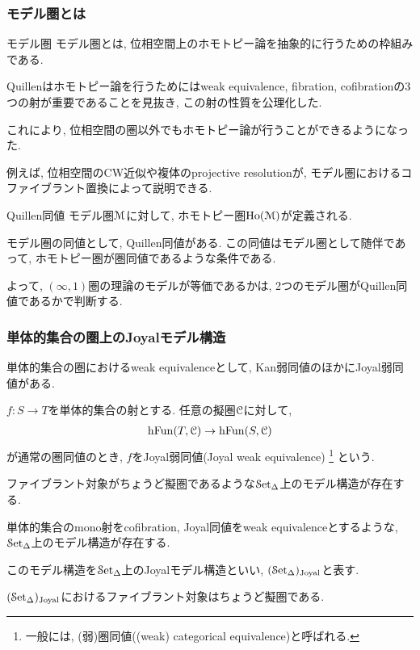 \documentclass[aspectratio=169, dvipdfmx, 8pt, notheorems, uplatex]{beamer}
\begin{document}
\begin{frame}
  \frametitle{モデル圏とは}

  \begin{block}{モデル圏}
    モデル圏とは, 位相空間上のホモトピー論を抽象的に行うための枠組みである. 

    Quillenはホモトピー論を行うためにはweak equivalence, fibration, cofibrationの3つの射が重要であることを見抜き, この射の性質を公理化した. 

    これにより, 位相空間の圏以外でもホモトピー論が行うことができるようになった. 

    例えば, 位相空間のCW近似や複体のprojective resolutionが, モデル圏におけるコファイブラント置換によって説明できる. 
  \end{block}

  \begin{block}{Quillen同値}
    モデル圏$\mathcal{M}$に対して, ホモトピー圏$\mathrm{Ho}(\mathcal{M})$が定義される. 
    
    モデル圏の同値として, Quillen同値がある. 
    この同値はモデル圏として随伴であって, ホモトピー圏が圏同値であるような条件である. 

    よって, $(\infty,1)$圏の理論のモデルが等価であるかは, 2つのモデル圏がQuillen同値であるかで判断する. 
  \end{block}

\end{frame}

\begin{frame}
  \frametitle{単体的集合の圏上のJoyalモデル構造}

  単体的集合の圏におけるweak equivalenceとして, Kan弱同値のほかにJoyal弱同値がある. 

  \begin{definition}[Joyal弱同値]
    $f : S \to T$を単体的集合の射とする.
    任意の擬圏$\mathcal{C}$に対して, 
    \begin{align*}
      \mathrm{h}\mathrm{Fun}(T,\mathcal{C}) \to \mathrm{h}\mathrm{Fun}(S,\mathcal{C})
    \end{align*}
    が通常の圏同値のとき, $f$をJoyal弱同値(Joyal weak equivalence)
    \footnote{
      一般には, (弱)圏同値((weak) categorical equivalence)と呼ばれる. 
    }
    という. 
  \end{definition}

  ファイブラント対象がちょうど擬圏であるような$\mathcal{S}\mathrm{et}_{\Delta}$上のモデル構造が存在する. 

  \begin{theorem}[Joyalモデル構造]
    単体的集合のmono射をcofibration, Joyal同値をweak equivalenceとするような, $\mathcal{S}\mathrm{et}_{\Delta}$上のモデル構造が存在する. 

    このモデル構造を$\mathcal{S}\mathrm{et}_{\Delta}$上のJoyalモデル構造といい, $(\mathcal{S}\mathrm{et}_{\Delta})_{\mathrm{Joyal}}$と表す. 
  \end{theorem}

  \begin{theorem}
    $(\mathcal{S}\mathrm{et}_{\Delta})_{\mathrm{Joyal}}$におけるファイブラント対象はちょうど擬圏である. 
  \end{theorem}

\end{frame}
\end{document}
